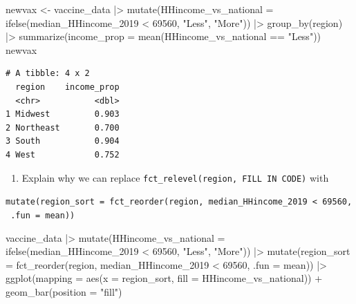 \documentclass[
  letterpaper,
  DIV=11,
  numbers=noendperiod]{scrartcl}
\newenvironment{Shaded}{\begin{snugshade}}{\end{snugshade}}
\newcommand{\AttributeTok}[1]{\textcolor[rgb]{0.40,0.45,0.13}{#1}}
\newcommand{\DecValTok}[1]{\textcolor[rgb]{0.68,0.00,0.00}{#1}}
\newcommand{\FunctionTok}[1]{\textcolor[rgb]{0.28,0.35,0.67}{#1}}
\newcommand{\NormalTok}[1]{\textcolor[rgb]{0.00,0.23,0.31}{#1}}
\newcommand{\OtherTok}[1]{\textcolor[rgb]{0.00,0.23,0.31}{#1}}
\newcommand{\SpecialCharTok}[1]{\textcolor[rgb]{0.37,0.37,0.37}{#1}}
\newcommand{\StringTok}[1]{\textcolor[rgb]{0.13,0.47,0.30}{#1}}
\providecommand{\tightlist}{%
  \setlength{\itemsep}{0pt}\setlength{\parskip}{0pt}}
\begin{document}
\begin{Shaded}
\begin{Highlighting}[]
\NormalTok{newvax }\OtherTok{\textless{}{-}}\NormalTok{ vaccine\_data }\SpecialCharTok{|\textgreater{}}
  \FunctionTok{mutate}\NormalTok{(}\AttributeTok{HHincome\_vs\_national =} \FunctionTok{ifelse}\NormalTok{(median\_HHincome\_2019 }\SpecialCharTok{\textless{}} \DecValTok{69560}\NormalTok{, }\StringTok{"Less"}\NormalTok{, }\StringTok{"More"}\NormalTok{)) }\SpecialCharTok{|\textgreater{}}
  \FunctionTok{group\_by}\NormalTok{(region) }\SpecialCharTok{|\textgreater{}} 
  \FunctionTok{summarize}\NormalTok{(}\AttributeTok{income\_prop =} \FunctionTok{mean}\NormalTok{(HHincome\_vs\_national }\SpecialCharTok{==} \StringTok{"Less"}\NormalTok{))}
\NormalTok{newvax}
\end{Highlighting}
\end{Shaded}

\begin{verbatim}
# A tibble: 4 x 2
  region    income_prop
  <chr>           <dbl>
1 Midwest         0.903
2 Northeast       0.700
3 South           0.904
4 West            0.752
\end{verbatim}

\begin{enumerate}
\def\labelenumi{\alph{enumi})}
\setcounter{enumi}{2}
\tightlist
\item
  Explain why we can replace
  \texttt{fct\_relevel(region,\ FILL\ IN\ CODE)} with
\end{enumerate}

\texttt{mutate(region\_sort\ =\ fct\_reorder(region,\ median\_HHincome\_2019\ \textless{}\ 69560,\ .fun\ =\ mean))}

\begin{Shaded}
\begin{Highlighting}[]
\NormalTok{vaccine\_data }\SpecialCharTok{|\textgreater{}}
  \FunctionTok{mutate}\NormalTok{(}\AttributeTok{HHincome\_vs\_national =} \FunctionTok{ifelse}\NormalTok{(median\_HHincome\_2019 }\SpecialCharTok{\textless{}} \DecValTok{69560}\NormalTok{, }\StringTok{"Less"}\NormalTok{, }\StringTok{"More"}\NormalTok{)) }\SpecialCharTok{|\textgreater{}}
\FunctionTok{mutate}\NormalTok{(}\AttributeTok{region\_sort =} \FunctionTok{fct\_reorder}\NormalTok{(region, median\_HHincome\_2019 }\SpecialCharTok{\textless{}} \DecValTok{69560}\NormalTok{, }\AttributeTok{.fun =}\NormalTok{ mean)) }\SpecialCharTok{|\textgreater{}}
  \FunctionTok{ggplot}\NormalTok{(}\AttributeTok{mapping =} \FunctionTok{aes}\NormalTok{(}\AttributeTok{x =}\NormalTok{ region\_sort, }\AttributeTok{fill =}\NormalTok{ HHincome\_vs\_national)) }\SpecialCharTok{+}
    \FunctionTok{geom\_bar}\NormalTok{(}\AttributeTok{position =} \StringTok{"fill"}\NormalTok{)}
\end{Highlighting}
\end{Shaded}
\end{document}
